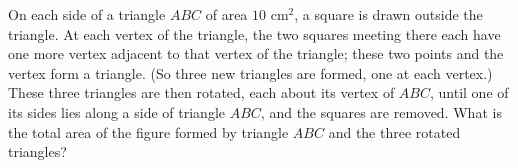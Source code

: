On each side of a triangle $ABC$ of area $10\text{ cm}^2$, a square is drawn outside the triangle. At each vertex of the triangle, the two squares meeting there each have one more vertex adjacent to that vertex of the triangle; these two points and the vertex form a triangle. (So three new triangles are formed, one at each vertex.) These three triangles are then rotated, each about its vertex of $ABC$, until one of its sides lies along a side of triangle $ABC$, and the squares are removed. What is the total area of the figure formed by triangle $ABC$ and the three rotated triangles?
